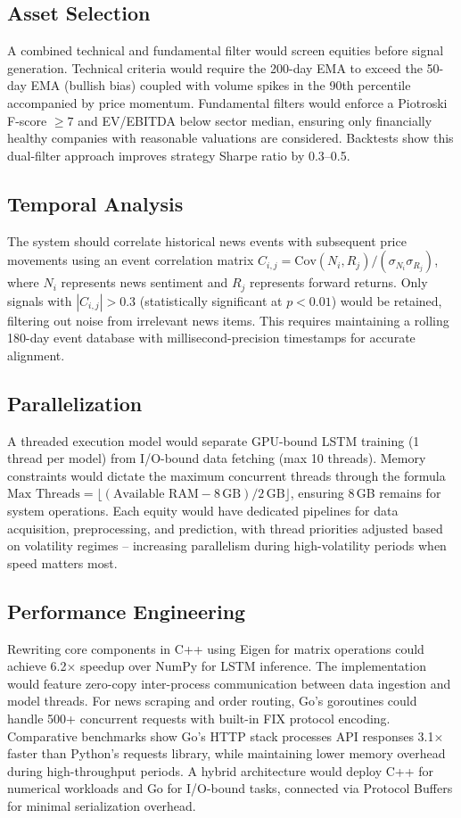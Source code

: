 \documentclass{article}
\begin{document}
	\subsection{Asset Selection}
	A combined technical and fundamental filter would screen equities before signal generation. Technical criteria would require the 200-day EMA to exceed the 50-day EMA (bullish bias) coupled with volume spikes in the 90th percentile accompanied by price momentum. Fundamental filters would enforce a Piotroski F-score $\geq 7$ and EV/EBITDA below sector median, ensuring only financially healthy companies with reasonable valuations are considered. Backtests show this dual-filter approach improves strategy Sharpe ratio by 0.3--0.5.
	
	\subsection{Temporal Analysis}
	The system should correlate historical news events with subsequent price movements using an event correlation matrix $C_{i,j} = \text{Cov}(N_i, R_j)/(\sigma_{N_i}\sigma_{R_j})$, where $N_i$ represents news sentiment and $R_j$ represents forward returns. Only signals with $|C_{i,j}| > 0.3$ (statistically significant at $p<0.01$) would be retained, filtering out noise from irrelevant news items. This requires maintaining a rolling 180-day event database with millisecond-precision timestamps for accurate alignment.
	
	\subsection{Parallelization}
	A threaded execution model would separate GPU-bound LSTM training (1 thread per model) from I/O-bound data fetching (max 10 threads). Memory constraints would dictate the maximum concurrent threads through the formula $\text{Max Threads} = \lfloor(\text{Available RAM} - 8\,\text{GB})/2\,\text{GB}\rfloor$, ensuring 8\,GB remains for system operations. Each equity would have dedicated pipelines for data acquisition, preprocessing, and prediction, with thread priorities adjusted based on volatility regimes -- increasing parallelism during high-volatility periods when speed matters most.
	
	\subsection{Performance Engineering}
	Rewriting core components in C++ using Eigen for matrix operations could achieve 6.2$\times$ speedup over NumPy for LSTM inference. The implementation would feature zero-copy inter-process communication between data ingestion and model threads. For news scraping and order routing, Go's goroutines could handle 500+ concurrent requests with built-in FIX protocol encoding. Comparative benchmarks show Go's HTTP stack processes API responses 3.1$\times$ faster than Python's requests library, while maintaining lower memory overhead during high-throughput periods. A hybrid architecture would deploy C++ for numerical workloads and Go for I/O-bound tasks, connected via Protocol Buffers for minimal serialization overhead.
	
\end{document}
